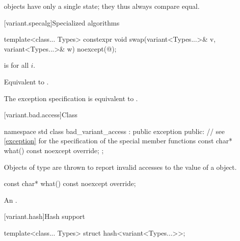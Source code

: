 \begin{itemdescr}
\pnum
\begin{note}
 objects have only a single state; they thus always compare equal.
\end{note}
\end{itemdescr}

[variant.specalg]{Specialized algorithms}

%
\begin{itemdecl}
template<class... Types>
  constexpr void swap(variant<Types...>& v, variant<Types...>& w) noexcept(@\seebelow@);
\end{itemdecl}

\begin{itemdescr}
\pnum
\constraints
{}
is  for all $i$.

\pnum
\effects
Equivalent to .

\pnum
\remarks
The exception specification is equivalent to .
\end{itemdescr}

[variant.bad.access]{Class }%
%

\begin{codeblock}
namespace std {
  class bad_variant_access : public exception {
  public:
    // see \ref{exception} for the specification of the special member functions
    const char* what() const noexcept override;
  };
}
\end{codeblock}

\pnum
Objects of type  are thrown to report invalid
accesses to the value of a  object.

%
\begin{itemdecl}
const char* what() const noexcept override;
\end{itemdecl}

\begin{itemdescr}
\pnum
\returns
An  \ntbs{}.
\end{itemdescr}

[variant.hash]{Hash support}

%
\begin{itemdecl}
template<class... Types> struct hash<variant<Types...>>;
\end{itemdecl}


